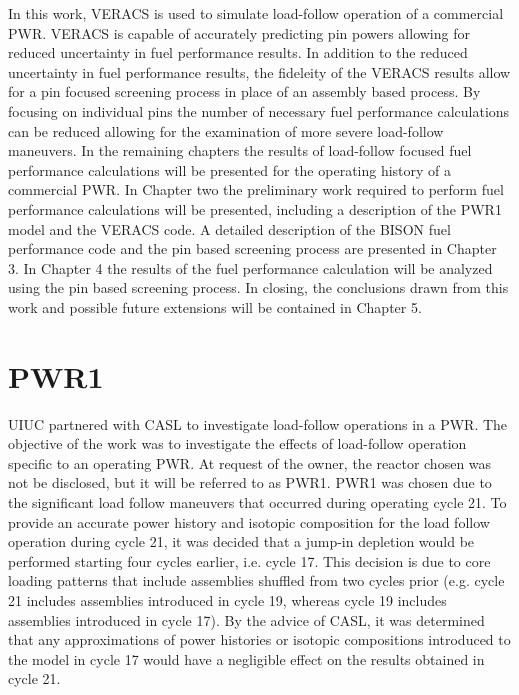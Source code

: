 \documentclass[edeposit,fullpage,11pt]{uiucthesis2009}
\begin{document}
In this work, \gls{VERACS} is used to simulate load-follow operation of a commercial \gls{PWR}.
\gls{VERACS} is capable of accurately predicting pin powers allowing for reduced uncertainty in fuel performance results.
In addition to the reduced uncertainty in fuel performance results, the fideleity of the \gls{VERACS} results allow for a pin focused screening process in place of an assembly based process.
By focusing on individual pins the number of necessary fuel performance calculations can be reduced allowing for the examination of more severe load-follow maneuvers.
In the remaining chapters the results of load-follow focused fuel performance calculations will be presented for the operating history of a commercial \gls{PWR}.
In Chapter two the preliminary work required to perform fuel performance calculations will be presented, including a description of the PWR1 model and the \gls{VERACS} code. 
A detailed description of the BISON fuel performance code and the pin based screening process are presented in Chapter 3.
In Chapter 4 the results of the fuel performance calculation will be analyzed using the pin based screening process.
In closing, the conclusions drawn from this work and possible future extensions will be contained in Chapter 5.


\chapter{PWR1}
\gls{UIUC} partnered with \gls{CASL} to investigate load-follow operations in a PWR. 
The objective of the work was to investigate the effects of load-follow operation specific to an operating PWR. 
At request of the owner, the reactor chosen was not be disclosed, but it will be referred to as PWR1.
PWR1 was chosen due to the significant load follow maneuvers that occurred during operating cycle 21. 
To provide an accurate power history and isotopic composition for the load follow operation during cycle 21, it was decided that a jump-in depletion would be performed starting four cycles earlier, i.e. cycle 17. 
This decision is due to core loading patterns that include assemblies shuffled from two cycles prior (e.g. cycle 21 includes assemblies introduced in cycle 19, whereas cycle 19 includes assemblies introduced in cycle 17). 
By the advice of \gls{CASL}, it was determined that any approximations of power histories or isotopic compositions introduced to the model in cycle 17 would have a negligible effect on the results obtained in cycle 21.
\end{document}
